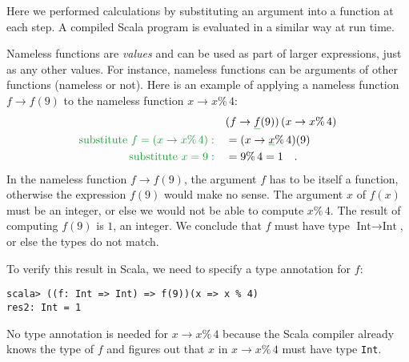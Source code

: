 Here we performed calculations by substituting an argument into a
function at each step. A compiled Scala program is evaluated in a
similar way at run time.

Nameless functions are \emph{values} and can be used as part of larger
expressions, just as any other values. For instance, nameless functions
can be arguments of other functions (nameless or not). Here is an
example of applying a nameless function $f\rightarrow f(9)$ to the
nameless function $x\rightarrow x\%\,4$:
\begin{align*}
 & (f\rightarrow\gunderline f(9))\left(x\rightarrow x\%\,4\right)\\
{\color{greenunder}\text{substitute }f=\left(x\rightarrow x\%\,4\right):}\quad & =(x\rightarrow\gunderline x\%\,4)(9)\\
{\color{greenunder}\text{substitute }x=9:}\quad & =9\%\,4=1\quad.
\end{align*}
In the nameless function $f\rightarrow f(9)$, the argument $f$ has
to be itself a function, otherwise the expression $f(9)$ would make
no sense. The argument $x$ of $f(x)$ must be an integer, or else
we would not be able to compute $x\%\,4$. The result of computing
$f(9)$ is $1$, an integer. We conclude that $f$ must have type
$\text{Int}\rightarrow\text{Int}$, or else the types do not match.

To verify this result in Scala, we need to specify a type annotation
for $f$:
\begin{lstlisting}
scala> ((f: Int => Int) => f(9))(x => x % 4)
res2: Int = 1
\end{lstlisting}
No type annotation is needed for $x\rightarrow x\%\,4$ because the
Scala compiler already knows the type of $f$ and figures out that
$x$ in $x\rightarrow x\%\,4$ must have type \lstinline!Int!.

